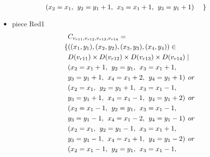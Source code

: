 \begin{appendices}
\begin{itemize}
\begin{align*}
&(x_{2} = x_{1},\hspace{1ex}y_{2} = y_{1}+1,\hspace{1ex}x_{3} = x_{1}+1, \hspace{1ex}y_{3} = y_{1}+1) \hspace{3ex} \}
\end{align*}
\item piece Red1 
\begin{align*}
&\Const{r11}{r12}{r13}{r14}=\\
\{&((x_{1},y_{1}),(x_{2},y_{2}),(x_{3},y_{3}),(x_{4},y_{4}))\in 
\\&\Domain{r11}\times \Domain{r12}\times\Domain{r13}\times\Domain{r14}\mid\\
&(x_{2} = x_{1} + 1,\hspace{1ex}y_{2} = y_{1},\hspace{1ex}x_{3} = x_{1} + 1, 
\\&y_{3} = y_{1}+1,\hspace{1ex}x_{4} = x_{1}+2,\hspace{1ex}y_{4} = y_{1}+1)\hspace{1ex} or\\
&(x_{2} = x_{1},\hspace{1ex}y_{2} = y_{1}+1,\hspace{1ex}x_{3} = x_{1}-1, 
\\&y_{3} = y_{1}+1,\hspace{1ex}x_{4} = x_{1}-1,\hspace{1ex}y_{4} = y_{1}+2)\hspace{1ex} or\\
&(x_{2} = x_{1}-1,\hspace{1ex}y_{2} = y_{1},\hspace{1ex}x_{3} = x_{1}-1,
\\&y_{3} = y_{1}-1,\hspace{1ex}x_{4} = x_{1}-2,\hspace{1ex}y_{4} = y_{1}-1)\hspace{1ex} or\\
&(x_{2} = x_{1},\hspace{1ex}y_{2} = y_{1}-1,\hspace{1ex}x_{3} = x_{1}+1, 
\\&y_{3} = y_{1}-1,\hspace{1ex}x_{4} = x_{1}+1,\hspace{1ex}y_{4} = y_{1}-2)\hspace{1ex} or\\
&(x_{2} = x_{1}-1,\hspace{1ex}y_{2} = y_{1},\hspace{1ex}x_{3} = x_{1}-1, 

\end{align*}
\end{itemize}
\end{appendices}
